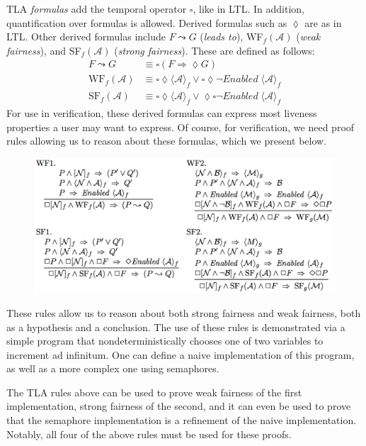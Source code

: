 \documentclass{llncs}
\begin{document}
TLA \textit{formulas} add the temporal operator $\square$, like in LTL. In
addition, quantification over formulas is allowed. Derived formulas such as
$\lozenge$ are as in LTL. Other derived formulas include $F \leadsto G$
(\textit{leads to}), WF$_f(\mathcal A)$ (\textit{weak fairness}), and
SF$_f(\mathcal A)$ (\textit{strong fairness}). These are defined as follows:
\begin{align*}
  F \leadsto G &\equiv \square(F \Rightarrow \lozenge G) \\
  \text{WF}_f(\mathcal A) &\equiv \square\lozenge\langle\mathcal A\rangle_f \vee \square\lozenge\neg Enabled\;\langle\mathcal A\rangle_f \\
  \text{SF}_f(\mathcal A) &\equiv \square\lozenge\langle\mathcal A\rangle_f \vee \lozenge\square\neg Enabled\;\langle\mathcal A\rangle_f
\end{align*}
For use in verification, these derived formulas can express most liveness
properties a user may want to express. Of course, for verification, we need
proof rules allowing us to reason about these formulas, which we present below.

\begin{figure}
\includegraphics[scale=0.6]{tla-rules}
\centering
\end{figure}

These rules allow us to reason about both strong fairness and weak fairness,
both as a hypothesis and a conclusion. The use of these rules is demonstrated
via a simple program that nondeterministically chooses one of two variables to
increment ad infinitum. One can define a naive implementation of this program,
as well as a more complex one using semaphores.

The TLA rules above can be used to prove weak fairness of the first
implementation, strong fairness of the second, and it can even be used to prove
that the semaphore implementation is a refinement of the naive implementation.
Notably, all four of the above rules must be used for these proofs.
\end{document}
